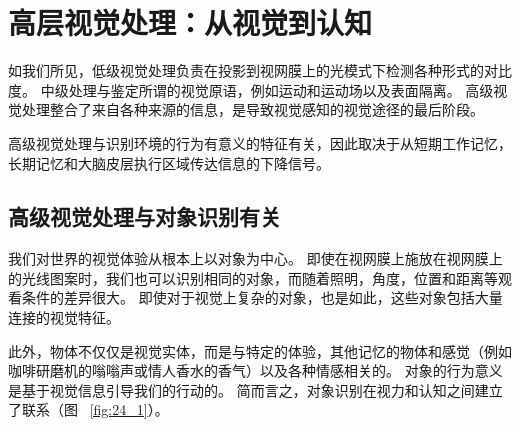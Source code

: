 \chapter{高层视觉处理：从视觉到认知} \label{chap:chap24}

如我们所见，低级视觉处理负责在投影到视网膜上的光模式下检测各种形式的对比度。
中级处理与鉴定所谓的视觉原语，例如运动和运动场以及表面隔离。
高级视觉处理整合了来自各种来源的信息，是导致视觉感知的视觉途径的最后阶段。


高级视觉处理与识别环境的行为有意义的特征有关，因此取决于从短期工作记忆，长期记忆和大脑皮层执行区域传达信息的下降信号。


\section{高级视觉处理与对象识别有关}

我们对世界的视觉体验从根本上以对象为中心。
即使在视网膜上施放在视网膜上的光线图案时，我们也可以识别相同的对象，而随着照明，角度，位置和距离等观看条件的差异很大。
即使对于视觉上复杂的对象，也是如此，这些对象包括大量连接的视觉特征。


此外，物体不仅仅是视觉实体，而是与特定的体验，其他记忆的物体和感觉（例如咖啡研磨机的嗡嗡声或情人香水的香气）以及各种情感相关的。
对象的行为意义是基于视觉信息引导我们的行动的。
简而言之，对象识别在视力和认知之间建立了联系（图 ~\ref{fig:24_1}）。


